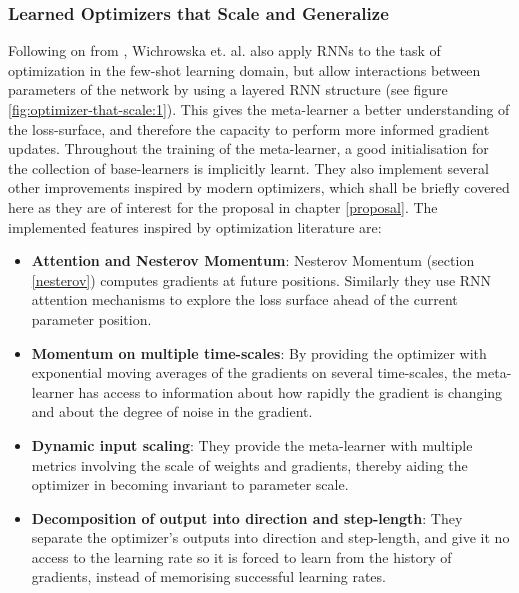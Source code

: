 \documentclass{report}
\begin{document}
	\subsubsection{Learned Optimizers that Scale and Generalize}
	Following on from \parencite{oaamffsl}, Wichrowska et. al. \parencite{lotsag} also apply RNNs to the task of optimization in the few-shot learning domain, but allow interactions between parameters of the network by using a layered RNN structure (see figure \ref{fig:optimizer-that-scale:1}). This gives the meta-learner a better understanding of the loss-surface, and therefore the capacity to perform more informed gradient updates. Throughout the training of the meta-learner, a good initialisation for the collection of base-learners is implicitly learnt. They also implement several other improvements inspired by modern optimizers, which shall be briefly covered here as they are of interest for the proposal in chapter \ref{proposal}.
	The implemented features inspired by optimization literature are:
	\begin{itemize}
		\item\textbf{Attention and Nesterov Momentum}: Nesterov Momentum (section \ref{nesterov}) computes gradients at future positions. Similarly they use RNN attention mechanisms to explore the loss surface ahead of the current parameter position.
		\item\textbf{Momentum on multiple time-scales}: By providing the optimizer with exponential moving averages of the gradients on several time-scales, the meta-learner has access to information about how rapidly the gradient is changing and about the degree of noise in the gradient.
		\item\textbf{Dynamic input scaling}: They provide the meta-learner with multiple metrics involving the scale of weights and gradients, thereby aiding the optimizer in becoming invariant to parameter scale.
		\item\textbf{Decomposition of output into direction and step-length}: They separate the optimizer's outputs into direction and step-length, and give it no access to the learning rate so it is forced to learn from the history of gradients, instead of memorising successful learning rates.
	\end{itemize}
\end{document}
